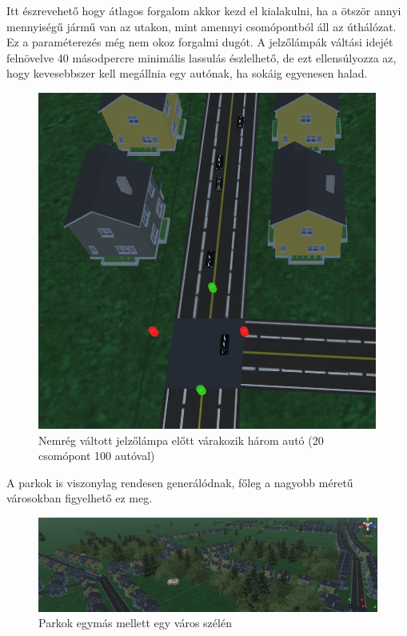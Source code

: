 Itt észrevehető hogy átlagos forgalom akkor kezd el kialakulni, ha a ötször annyi mennyiségű jármű van az utakon, mint amennyi csomópontból áll az úthálózat. Ez a paraméterezés még nem okoz forgalmi dugót.
A jelzőlámpák váltási idejét felnövelve 40 másodpercre minimális lassulás észlelhető, de ezt ellensúlyozza az, hogy kevesebbszer kell megállnia egy autónak, ha sokáig egyenesen halad.
\begin{figure}[H]
\includegraphics[width=\linewidth]{increasedtraffic.png}
\caption{Nemrég váltott jelzőlámpa előtt várakozik három autó (20 csomópont 100 autóval)}
\label{fig:trafficbigger}
\end{figure}

A parkok is viszonylag rendesen generálódnak, főleg a nagyobb méretű városokban figyelhető ez meg.
\begin{figure}[H]
\includegraphics[width=\linewidth]{parks.png}
\caption{Parkok egymás mellett egy város szélén}
\label{fig:parks}
\end{figure}